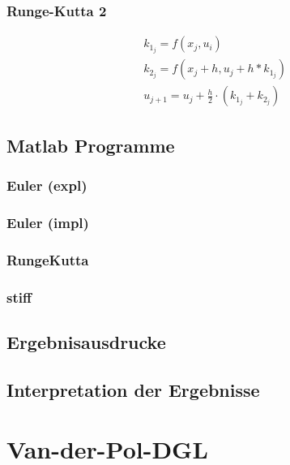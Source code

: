 \documentclass[10pt]{scrartcl}
\begin{document}
		\subsubsection{Runge-Kutta 2}
		\begin{align}
		&k_{1_{j}} = f(x_j, u_i)\\
		&k_{2_{j}} = f(x_j + h, u_j + h * k_{1_{j}})\\
		&u_{j+1} = u_j + \frac{h}{2} \cdot ( k_{1_{j}} + k_{2_{j}} )
		\end{align}			
		
	\subsection{Matlab Programme}
		\subsubsection{Euler (expl)}
			
		
		\subsubsection{Euler (impl)}
				
		
		\subsubsection{Runge\-Kutta}
				
		
		\subsubsection{stiff}		
		
	\subsection{Ergebnisausdrucke}	
		
	\subsection{Interpretation der Ergebnisse}		
		

\section{Van-der-Pol-DGL}
\end{document}
